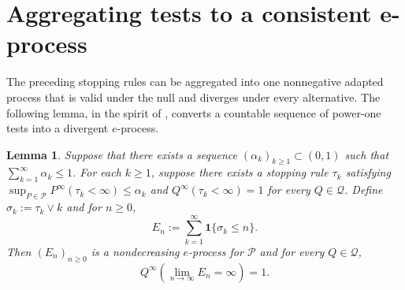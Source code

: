 \documentclass[11pt]{article}
\newcommand{\Pcal}{\mathcal{P}}
\newcommand{\Qcal}{\mathcal{Q}}
\newcommand{\one}{\mathbf{1}}
\newtheorem{lemma}[theorem]{Lemma}
\theoremstyle{definition}
\theoremstyle{definition}
\begin{document}
\section{Aggregating tests to a consistent e-process}\label{sec:eproc}

The preceding stopping rules can be aggregated into one nonnegative adapted process that is valid under the null and diverges under every alternative.  The following lemma, in the spirit of \textcite{ruf2023composite}, converts a countable sequence of power-one tests into a divergent $e$-process.

\begin{lemma}\label{lem:count-tests-to-eprocess}
Suppose that there exists a sequence $(\alpha_k)_{k\ge 1}\subset(0,1)$ such that $\sum_{k=1}^{\infty}\alpha_k\le 1$.  For each $k\ge1$, suppose there exists a stopping rule $\tau_k$ satisfying $\sup_{P\in\Pcal}P^{\infty}(\tau_k<\infty)\le \alpha_k$ and $Q^{\infty}(\tau_k<\infty)=1$ for every $Q\in\Qcal$. Define $\sigma_k:=\tau_k\vee k$ and for $n\ge 0$,
\[
E_n:=\sum_{k=1}^{\infty}\one\{\sigma_k\le n\}.
\]
Then $(E_n)_{n\ge 0}$ is a nondecreasing $e$-process for $\Pcal$ and for every $Q\in\Qcal$,
\[
Q^{\infty}\left(\lim_{n\to\infty}E_n=\infty\right)=1.
\]
\end{lemma}
\end{document}
